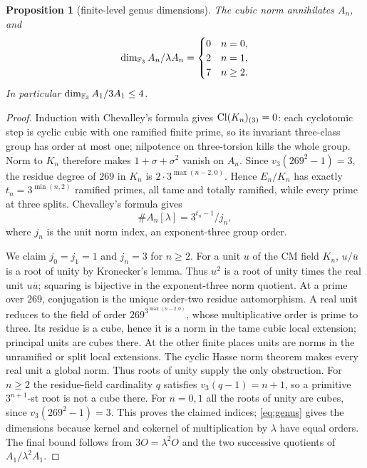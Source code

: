 \documentclass[11pt]{article}
\newtheorem{proposition}[theorem]{Proposition}
\theoremstyle{remark}\newtheorem{remark}[theorem]{Remark}
\begin{document}
\begin{proposition}[finite-level genus dimensions]
\label{prop:generators}
The cubic norm annihilates $A_n$, and
\[
 \dim_{\mathbb F_3}A_n/\lambda A_n=
 \begin{cases}0&n=0,\\2&n=1,\\7&n\geq2.\end{cases}
\]
In particular $\dim_{\mathbb F_3}A_1/3A_1\leq4$.
\end{proposition}
\begin{proof}
Induction with Chevalley's formula gives $\operatorname{Cl}(K_n)_{(3)}=0$:
each cyclotomic step is cyclic cubic with one ramified finite prime, so its invariant three-class group has order at most one; nilpotence on three-torsion kills the whole group.
Norm to $K_n$ therefore makes $1+\sigma+\sigma^2$ vanish on $A_n$.
Since $v_3(269^2-1)=3$, the residue degree of $269$ in $K_n$ is $2\cdot3^{\max(n-2,0)}$.
Hence $E_n/K_n$ has exactly $t_n=3^{\min(n,2)}$ ramified primes, all tame and totally ramified, while every prime at three splits.
Chevalley's formula gives
\begin{equation}
 \#A_n[\lambda]=3^{t_n-1}/j_n,\label{eq:genus}
\end{equation}
where $j_n$ is the unit norm index, an exponent-three group order.

We claim $j_0=j_1=1$ and $j_n=3$ for $n\geq2$.
For a unit $u$ of the CM field $K_n$, $u/\overline u$ is a root of unity by Kronecker's lemma.
Thus $u^2$ is a root of unity times the real unit $u\overline u$; squaring is bijective in the exponent-three norm quotient.
At a prime over $269$, conjugation is the unique order-two residue automorphism.
A real unit reduces to the field of order $269^{3^{\max(n-2,0)}}$, whose multiplicative order is prime to three.
Its residue is a cube, hence it is a norm in the tame cubic local extension; principal units are cubes there.
At the other finite places units are norms in the unramified or split local extensions.
The cyclic Hasse norm theorem \citep[Chapter VIII, Theorem 3.1]{Milne2020} makes every real unit a global norm.
Thus roots of unity supply the only obstruction.
For $n\geq2$ the residue-field cardinality $q$ satisfies $v_3(q-1)=n+1$, so a primitive $3^{n+1}$-st root is not a cube there.
For $n=0,1$ all the roots of unity are cubes, since $v_3(269^2-1)=3$.
This proves the claimed indices; \eqref{eq:genus} gives the dimensions because kernel and cokernel of multiplication by $\lambda$ have equal orders.
The final bound follows from $3O=\lambda^2O$ and the two successive quotients of $A_1/\lambda^2A_1$.
\end{proof}
\end{document}
